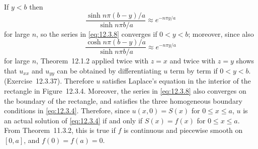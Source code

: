 \begin{examplesolution}
If $y<b$ then
\begin{equation}
  \label{eq:12.3.9}\frac{\sinh n\pi(b-y)/a}{\sinh n\pi b/a}\approx e^{-n\pi y/a}
\end{equation}
for large $n$, so the series in \eqref{eq:12.3.8} converges if $0<y<b$; moreover, since also
\[
  \frac{\cosh n\pi(b-y)/a}{\sinh n\pi b/a}\approx e^{-n\pi y/a}
\]
for large $n$, Theorem~12.1.2 applied twice with $z=x$ and twice with $z=y$ shows
that $u_{xx}$ and $u_{yy}$ can be obtained by differentiating $u$ term by term if $0<y<b$.
(Exercise~12.3.37). Therefore $u$ satisfies Laplace's equation in the interior of the
rectangle in Figure~12.3.4. Moreover, the series in \eqref{eq:12.3.8} also converges on
the boundary of the rectangle, and satisfies the three homogeneous boundary conditions in
\eqref{eq:12.3.4}. Therefore, since $u(x,0)=S(x)$ for $0\le x\le a$, $u$ is an actual solution of
\eqref{eq:12.3.4} if and only if $S(x)=f(x)$ for $0\le x\le a$. From Theorem~11.3.2,
this is true if $f$ is continuous and piecewise smooth on $[0,a]$, and $f(0)=f(a)=0$.
\end{examplesolution}

